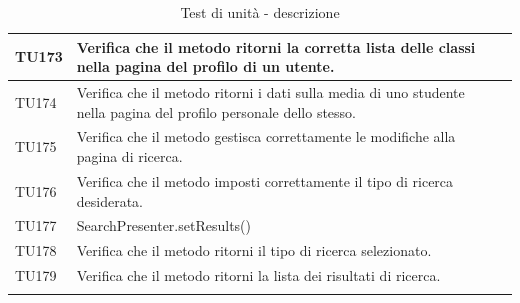 \begin{longtable}{|>{\centering\arraybackslash}m{1.6cm}|>{\centering\arraybackslash}m{6.41cm}|>{\centering\arraybackslash}m{3.1cm}| c |}
		TU173 & Verifica che il metodo ritorni la corretta lista delle classi nella pagina del profilo di un utente. \\ \hline
		TU174 & Verifica che il metodo ritorni i dati sulla media di uno studente nella pagina del profilo personale dello stesso. \\ \hline
		TU175 & Verifica che il metodo gestisca correttamente le modifiche alla pagina di ricerca. \\ \hline
		TU176 & Verifica che il metodo imposti correttamente il tipo di ricerca desiderata. \\ \hline
		TU177 & SearchPresenter.setResults()\\ \hline
		TU178 & Verifica che il metodo ritorni il tipo di ricerca selezionato. \\ \hline
		TU179 & Verifica che il metodo ritorni la lista dei risultati di ricerca. \\ \hline
		
		\caption{Test di unità - descrizione}
\end{longtable}

